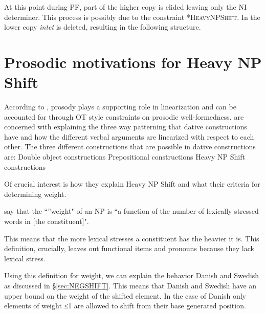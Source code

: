 \documentclass[12pt, letterpaper]{article}
\begin{document}
\ex At this point during PF, part of the higher copy is elided leaving only the NI determiner. This process is possibly due to the constraint *\textsc{HeavyNPShift}. In the lower copy \emph{intet} is deleted, resulting in the following structure.
\ea \label{ex:tree} 
	\z
\z 

\section{Prosodic motivations for Heavy NP Shift} \label{sec:HNPS}

\ea According to \citet{anttilaRoleProsodyEnglish2010}, prosody plays a supporting role in linearization and can be accounted for through OT style constraints on prosodic well-formedness. 
\ex \citeauthor{anttilaRoleProsodyEnglish2010} are concerned with explaining the three way patterning that dative constructions have and how the different verbal arguments are linearized with respect to each other. 
\ex The three different constructions that are possible in dative constructions are:
	\ea Double object constructions
	\ex Prepositional constructions
	\ex Heavy NP Shift constructions
	\z

\ex Of crucial interest is how they explain Heavy NP Shift and what their criteria for determining weight.

\ex \citet[949]{anttilaRoleProsodyEnglish2010} say that the ``''weight" of an NP is ``a function of the number of lexically stressed words in [the constituent]".

\ex This means that the more lexical stresses a constituent has the heavier it is. This definition, crucially, leaves out functional items and pronouns because they lack lexical stress. 

\ex Using this definition for weight, we can explain the behavior Danish and Swedish as discussed in §\ref{sec:NEGSHIFT}. This means that Danish and Swedish have an upper bound on the weight of the shifted element. In the case of Danish only elements of weight ≤1 are allowed to shift from their base generated position. 
\end{document}

